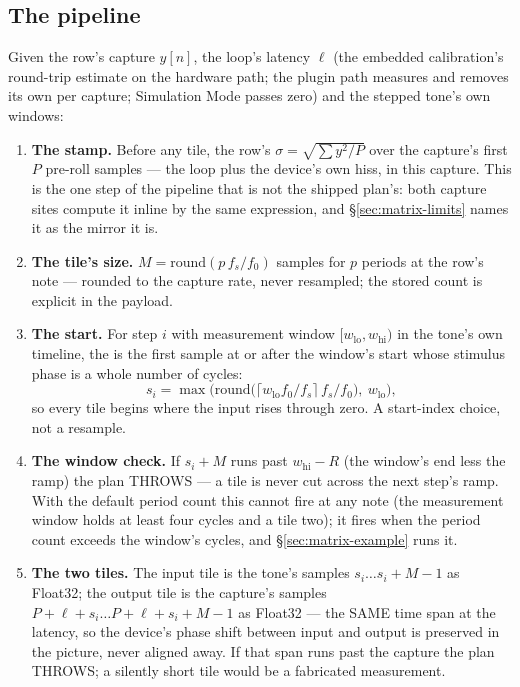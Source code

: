 \documentclass[11pt,a4paper]{article}
\begin{document}
\subsection{The pipeline}
\label{sec:matrix-pipeline}
Given the row's capture $y[n]$, the loop's latency $\ell$ (the embedded
calibration's round-trip estimate on the hardware path; the plugin path
measures and removes its own per capture; Simulation Mode passes zero)
and the stepped tone's own windows:
{\sloppy
\begin{enumerate}
\item \textbf{The stamp.} Before any tile, the row's 
$\sigma = \sqrt{\sum y^2 / P}$ over the capture's first $P$ pre-roll
samples --- the loop plus the device's own hiss, in this capture. This is
the one step of the pipeline that is not the shipped plan's: both
capture sites compute it inline by the same expression, and
\S\ref{sec:matrix-limits} names it as the mirror it is.

\item \textbf{The tile's size.} $M = \mathrm{round}(p\, f_s / f_0)$
samples for $p$ periods at the row's note --- rounded to the capture
rate, never resampled; the stored count is explicit in the payload.

\item \textbf{The start.} For step $i$ with measurement window
$[w_{\mathrm{lo}}, w_{\mathrm{hi}})$ in the tone's own timeline, the
 is the first sample at or after the window's
start whose stimulus phase is a whole number of cycles:
\begin{equation}
  s_i = \max\!\Big(\mathrm{round}\big(\lceil w_{\mathrm{lo}} f_0 / f_s\rceil\, f_s / f_0\big),\ w_{\mathrm{lo}}\Big),
  \label{eq:tilestart}
\end{equation}
so every tile begins where the input rises through zero. A start-index
choice, not a resample.

\item \textbf{The window check.} If $s_i + M$ runs past
$w_{\mathrm{hi}} - R$ (the window's end less the ramp) the plan THROWS
--- a tile is never cut across the next step's ramp. With the default
period count this cannot fire at any note (the measurement window holds
at least four cycles and a tile two); it fires when the period count
exceeds the window's cycles, and \S\ref{sec:matrix-example} runs it.

\item \textbf{The two tiles.} The input tile is the tone's samples
$s_i \ldots s_i + M - 1$ as Float32; the output tile is the capture's
samples $P + \ell + s_i \ldots P + \ell + s_i + M - 1$ as Float32 --- the
SAME time span at the latency, so the device's phase shift between input
and output is preserved in the picture, never aligned away. If that span
runs past the capture the plan THROWS; a silently short tile would be a
fabricated measurement.


\end{enumerate}}
\end{document}
